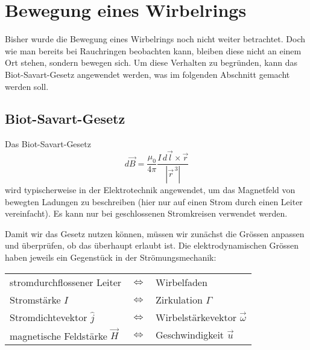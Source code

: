 %
%
%
\section{Bewegung eines Wirbelrings\label{Wirbelringe:Bewegung}}

Bisher wurde die Bewegung eines Wirbelrings noch nicht weiter betrachtet. 
Doch wie man bereits bei Rauchringen beobachten kann, bleiben diese nicht an einem Ort stehen, sondern bewegen sich. 
Um diese Verhalten zu begründen, kann das Biot-Savart-Gesetz \cite{Wirbelringe:FuehrerdurchdieStroemungslehre} angewendet werden, was im folgenden Abschnitt gemacht werden soll.

\subsection{Biot-Savart-Gesetz}

Das Biot-Savart-Gesetz
\[
d \vec{B}
=
\frac{\mu_0}{4\pi}\frac{I \,d \vec{l} \times \vec{r}}{\left\lvert \vec{r}^{\,3}\right\rvert }
\]  %
wird typischerweise in der Elektrotechnik angewendet, um das Magnetfeld von bewegten Ladungen zu beschreiben (hier nur auf einen Strom durch einen Leiter vereinfacht).
Es kann nur bei geschlossenen Stromkreisen verwendet werden. 

Damit wir das Gesetz nutzen können, müssen wir zunächst die Grössen anpassen und überprüfen, ob das überhaupt erlaubt ist. 
Die elektrodynamischen Grössen haben jeweils ein Gegenstück in der Strömungsmechanik:

\begin{center}
    \begin{tabular}{lcl}
    stromdurchflossener Leiter          & \(\Leftrightarrow \) & Wirbelfaden \\
    Stromstärke \(I\)                   & \(\Leftrightarrow \) & Zirkulation \(\Gamma\) \\
    Stromdichtevektor \(\hat{j}\)       & \(\Leftrightarrow \) & Wirbelstärkevektor \(\vec{\omega}\)\\
    magnetische Feldstärke \(\vec{H}\)  & \(\Leftrightarrow \) & Geschwindigkeit \(\vec{u}\) \\
    \end{tabular}
\end{center}

